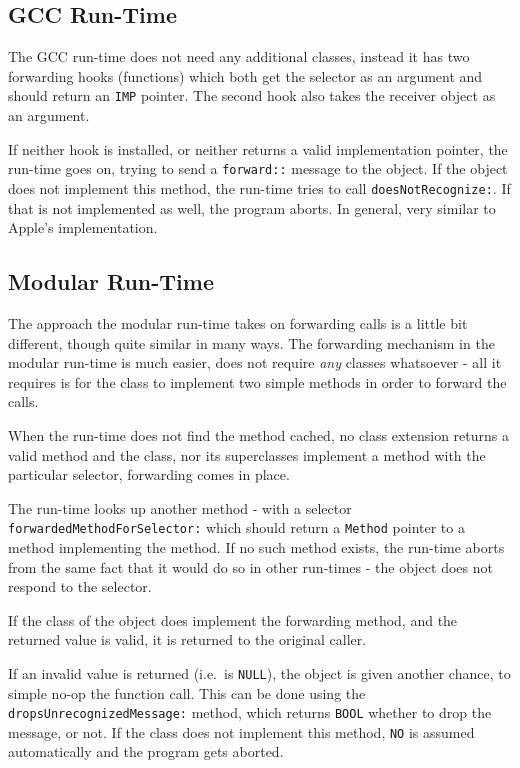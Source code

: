 \subsection{GCC Run-Time}

The GCC run-time does not need any additional classes, instead it has two forwarding hooks (functions) which both get the selector as an argument and should return an \verb=IMP= pointer. The second hook also takes the receiver object as an argument.

If neither hook is installed, or neither returns a valid implementation pointer, the run-time goes on, trying to send a \verb=forward::= message to the object. If the object does not implement this method, the run-time tries to call \verb=doesNotRecognize:=. If that is not implemented as well, the program aborts. In general, very similar to Apple's implementation.

\subsection{Modular Run-Time}
 
The approach the modular run-time takes on forwarding calls is a little bit different, though quite similar in many ways. The forwarding mechanism in the modular run-time is much easier, does not require \emph{any} classes whatsoever - all it requires is for the class to implement two simple methods in order to forward the calls.

When the run-time does not find the method cached, no class extension returns a valid method and the class, nor its superclasses implement a method with the particular selector, forwarding comes in place.

The run-time looks up another method - with a selector \verb=forwardedMethodForSelector:= which should return a \verb=Method= pointer to a method implementing the method. If no such method exists, the run-time aborts from the same fact that it would do so in other run-times - the object does not respond to the selector.

If the class of the object does implement the forwarding method, and the returned value is valid, it is returned to the original caller.

If an invalid value is returned (i.e.\ is \verb=NULL=), the object is given another chance, to simple no-op the function call. This can be done using the \verb=dropsUnrecognizedMessage:= method, which returns \verb=BOOL= whether to drop the message, or not. If the class does not implement this method, \verb=NO= is assumed automatically and the program gets aborted.

